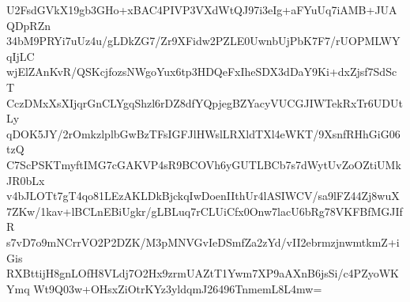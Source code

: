 U2FsdGVkX19gb3GHo+xBAC4PIVP3VXdWtQJ97i3eIg+aFYuUq7iAMB+JUAQDpRZn
34bM9PRYi7uUz4u/gLDkZG7/Zr9XFidw2PZLE0UwnbUjPbK7F7/rUOPMLWYqIjLC
wjElZAnKvR/QSKcjfozsNWgoYux6tp3HDQeFxIheSDX3dDaY9Ki+dxZjsf7SdScT
CczDMxXsXIjqrGnCLYgqShzl6rDZ8dfYQpjegBZYacyVUCGJIWTekRxTr6UDUtLy
qDOK5JY/2rOmkzlplbGwBzTFsIGFJlHWslLRXldTXl4eWKT/9XsnfRHhGiG06tzQ
C7ScPSKTmyftIMG7cGAKVP4sR9BCOVh6yGUTLBCb7s7dWytUvZoOZtiUMkJR0bLx
v4bJLOTt7gT4qo81LEzAKLDkBjckqIwDoenIIthUr4lASIWCV/sa9lFZ44Zj8wuX
7ZKw/1kav+lBCLnEBiUgkr/gLBLuq7rCLUiCfx0Onw7lacU6bRg78VKFBfMGJIfR
s7vD7o9mNCrrVO2P2DZK/M3pMNVGvIeDSmfZa2zYd/vII2ebrmzjnwmtkmZ+iGis
RXBttijH8gnLOfH8VLdj7O2Hx9zrmUAZtT1Ywm7XP9aAXnB6jsSi/c4PZyoWKYmq
Wt9Q03w+OHsxZiOtrKYz3yldqmJ26496TnmemL8L4mw=
